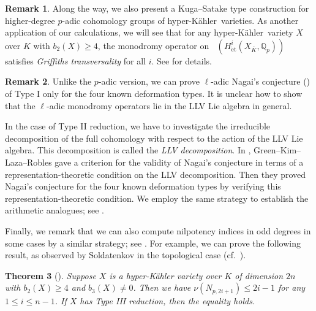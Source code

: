 \documentclass[12pt,reqno]{amsart}
\newtheorem{thm}{Theorem}[section]
\theoremstyle{definition}
\newtheorem{rem}[thm]{Remark}
\newcommand{\Q}{{\mathds Q}}
\DeclareMathOperator{\Dpst}{\mathit{D}_{\mathrm{pst}}}
\newcommand{\et}{\mathrm{\acute{e}t}}
\newcommand{\hk}{hyper-Kähler~}
\numberwithin{equation}{section}
\begin{document}
\begin{rem}\label{Remark:Griffiths transversality intro}
Along the way, we also present a Kuga--Satake type construction for higher-degree $p$-adic cohomology groups of \hk varieties.
As another application of our calculations, we will see that for any \hk variety $X$ over $K$ with $b_2(X) \geq 4$, the monodromy operator on $\Dpst(H^i_{\et}(X_{\overline{K}},\Q_p))$ satisfies \textit{Griffiths transversality} for all $i$.
See  for details.
\end{rem}

\begin{rem}
Unlike the $p$-adic version, we can prove $\ell$-adic Nagai's conjecture () of Type I only for the four known deformation types.
It is unclear how to show that the $\ell$-adic monodromy operators lie in the LLV Lie algebra in general.
\end{rem}

In the case of Type II reduction, 
we have to investigate the irreducible decomposition of the full cohomology with respect to the action of the LLV Lie algebra.
This decomposition is called the \textit{LLV decomposition}.
In \cite{GKLR}, Green--Kim--Laza--Robles gave a criterion for the validity of Nagai’s conjecture in terms of a representation-theoretic condition on the LLV decomposition.
Then they proved Nagai’s conjecture for the four known deformation types by verifying this representation-theoretic condition.
We employ the same strategy to establish the arithmetic analogues; see .

Finally, we remark that we can also compute nilpotency indices in odd degrees in some cases by a similar strategy; see .
For example, we can prove the following result, as observed by Soldatenkov in the topological case (cf.~\cite[Theorem 3.8]{Soldatenkov20a}).

\begin{thm}[]
\label{thm:type III odd cohomolgoy intro}
    Suppose $X$ is a hyper-Kähler variety over $K$ of dimension $2n$ with $b_2(X) \geq 4$ and $b_3(X) \neq 0$. Then we have
    $
    \nu(N_{p,2i+1}) \leq 2i-1
    $
    for any $1 \leq i \leq n-1$.
    If $X$ has Type III reduction, then the equality holds.
\end{thm}
\end{document}
